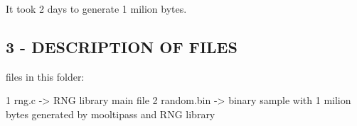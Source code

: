 It took 2 days to generate 1 milion bytes.

\subsection*{3 -\/ D\+E\+S\+C\+R\+I\+P\+T\+I\+ON OF F\+I\+L\+ES }


\begin{DoxyItemize}
\item files in this folder\+:
\end{DoxyItemize}


\begin{DoxyCode}
1 rng.c               -> RNG library main file
2 random.bin          -> binary sample with 1 milion bytes generated by mooltipass and RNG library
\end{DoxyCode}
 